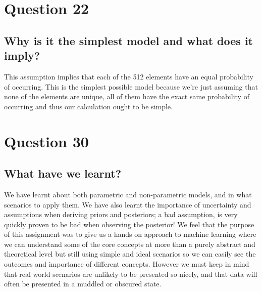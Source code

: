 \documentclass[a4paper, 9pt]{article}
\begin{document}
\section*{Question 22}
\subsection*{Why is it the simplest model and what does it imply?}
This assumption implies that each of the 512 elements have an equal probability of occurring.
This is the simplest possible model because we're just assuming that none of the elements are unique, all of them have the exact same probability of occurring and thus our calculation ought to be simple.

\section*{Question 30}
\subsection*{What have we learnt?}
We have learnt about both parametric and non-parametric models, and in what scenarios to apply them. We have also learnt the importance of uncertainty and assumptions when deriving priors and posteriors; a bad assumption, is very quickly proven to be bad when observing the posterior! We feel that the purpose of this assignment was to give us a hands on approach to machine learning where we can understand some of the core concepts at more than a purely abstract and theoretical level but still using simple and ideal scenarios so we can easily see the outcomes and importance of different concepts. However we must keep in mind that real world scenarios are unlikely to be presented so nicely, and that data will often be presented in a muddled or obscured state.
\end{document}
